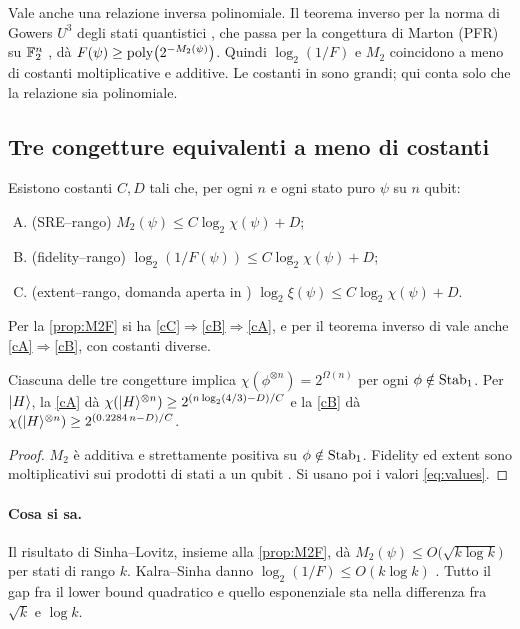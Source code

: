 \noindent Vale anche una relazione inversa polinomiale. Il teorema inverso per la norma di Gowers $U^3$ degli stati quantistici \cite{AD24}, che passa per la congettura di Marton (PFR) su $\mathbb F_2^n$ \cite{GGMT23}, dà $F(\psi)\ge\mathrm{poly}\bigl(2^{-M_2(\psi)}\bigr)$. Quindi $\log_2(1/F)$ e $M_2$ coincidono a meno di costanti moltiplicative e additive. Le costanti in \cite{AD24} sono grandi; qui conta solo che la relazione sia polinomiale.

\subsection{Tre congetture equivalenti a meno di costanti}

\begin{conjecture}\label{conj:main}
Esistono costanti $C,D$ tali che, per ogni $n$ e ogni stato puro $\psi$ su $n$ qubit:
\begin{enumerate}[(A),leftmargin=2em]
\item\label{cA} (SRE--rango) $M_2(\psi)\le C\log_2\chi(\psi)+D$;
\item\label{cB} (fidelity--rango) $\log_2(1/F(\psi))\le C\log_2\chi(\psi)+D$;
\item\label{cC} (extent--rango, domanda aperta in \cite{SL26}) $\log_2\xi(\psi)\le C\log_2\chi(\psi)+D$.
\end{enumerate}
\end{conjecture}

\noindent Per la \cref{prop:M2F} si ha \ref{cC}$\Rightarrow$\ref{cB}$\Rightarrow$\ref{cA}, e per il teorema inverso di \cite{AD24} vale anche \ref{cA}$\Rightarrow$\ref{cB}, con costanti diverse.

\begin{theorem}\label{thm:conj-exp}
Ciascuna delle tre congetture implica $\chi(\phi^{\otimes n})=2^{\Omega(n)}$ per ogni $\phi\notin\mathrm{Stab}_1$. Per $\lvert H\rangle$, la \ref{cA} dà $\chi(\lvert H\rangle^{\otimes n})\ge2^{(n\log_2(4/3)-D)/C}$ e la \ref{cB} dà $\chi(\lvert H\rangle^{\otimes n})\ge2^{(0.2284\,n-D)/C}$.
\end{theorem}

\begin{proof}
$M_2$ è additiva e strettamente positiva su $\phi\notin\mathrm{Stab}_1$. Fidelity ed extent sono moltiplicativi sui prodotti di stati a un qubit \cite{BBCCGH19}. Si usano poi i valori \eqref{eq:values}.
\end{proof}

\paragraph{Cosa si sa.} Il risultato di Sinha--Lovitz, insieme alla \cref{prop:M2F}, dà $M_2(\psi)\le O\bigl(\sqrt{k\log k}\bigr)$ per stati di rango $k$. Kalra--Sinha danno $\log_2(1/F)\le O(k\log k)$ \cite{KS25}. Tutto il gap fra il lower bound quadratico e quello esponenziale sta nella differenza fra $\sqrt k$ e $\log k$.

